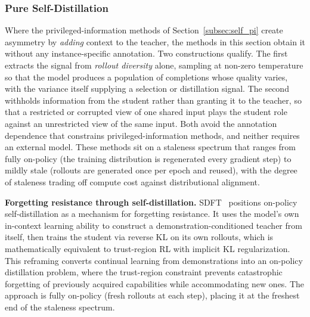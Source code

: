\documentclass{article} %
\begin{document}
\subsubsection{Pure Self-Distillation}
\label{subsec:self_play}

Where the privileged-information methods of Section~\ref{subsec:self_pi} create asymmetry by \emph{adding} context to the teacher, the methods in this section obtain it without any instance-specific annotation. Two constructions qualify. The first extracts the signal from \emph{rollout diversity} alone, sampling at non-zero temperature so that the model produces a population of completions whose quality varies, with the variance itself supplying a selection or distillation signal. The second withholds information from the student rather than granting it to the teacher, so that a restricted or corrupted view of one shared input plays the student role against an unrestricted view of the same input. Both avoid the annotation dependence that constrains privileged-information methods, and neither requires an external model. These methods sit on a staleness spectrum that ranges from fully on-policy (the training distribution is regenerated every gradient step) to mildly stale (rollouts are generated once per epoch and reused), with the degree of staleness trading off compute cost against distributional alignment.

\textbf{Forgetting resistance through self-distillation.} SDFT~\citep{2601.19897} positions on-policy self-distillation as a mechanism for forgetting resistance. It uses the model's own in-context learning ability to construct a demonstration-conditioned teacher from itself, then trains the student via reverse KL on its own rollouts, which is mathematically equivalent to trust-region RL with implicit KL regularization. This reframing converts continual learning from demonstrations into an on-policy distillation problem, where the trust-region constraint prevents catastrophic forgetting of previously acquired capabilities while accommodating new ones. The approach is fully on-policy (fresh rollouts at each step), placing it at the freshest end of the staleness spectrum.
\end{document}
